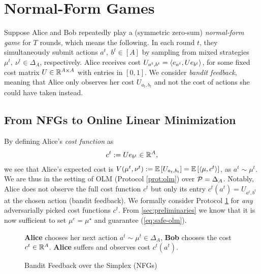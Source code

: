 \documentclass[11pt]{article}
\begin{document}
\section{Normal-Form Games} \label{sec:simplex}

Suppose Alice and Bob repeatedly play a (symmetric zero-sum) \emph{normal-form game} for $T$ rounds, which means the following. In each round $t$, they simultaneously submit actions $a^t,~b^t\in[A]$ by sampling from mixed strategies $\mu^t,~\nu^t\in\Delta_A$, respectively. Alice receives cost $U_{a^t,b^t}=\left\langle e_{a^t}, U e_{b^t} \right\rangle$, for some fixed cost matrix $U\in\mathbb{R}^{A\times A}$ with entries in $[0,1]$. We consider \emph{bandit feedback}, meaning that Alice only observes her cost $U_{a_t,b_t}$ and not the cost of actions she could have taken instead. 

\subsection{From NFGs to Online Linear Minimization} \label{sec:reduction}
By defining Alice's \emph{cost function} as
\begin{align*}
    c^t := U e_{b^t}\in\mathbb{R}^A,    
\end{align*}
we see that Alice's expected cost is $V(\mu^t,\nu^t):=\mathbb{E}\left[ U_{a_t,b_t} \right]=\mathbb{E}\left[ \left\langle \mu, c^t \right\rangle \right]$, as $a^t\sim \mu^t$. We are thus in the setting of OLM (Protocol \ref{prot:olm}) over $\mathcal{P}=\Delta_A$. Notably, Alice does not observe the full cost function $c^t$ but only its entry $c^t(a^t)=U_{a^t,b^t}$ at the chosen action (bandit feedback). We formally consider Protocol \ref{prot:bandit-simplex} for \emph{any} adversarially picked cost functions $c^t$. From \cref{sec:preliminaries} we know that it is now sufficient to set $\mu^c=\mu^\star$ and guarantee (\ref{eq:safe-olm}).
\begin{figure}[H]
\centering
\begin{minipage}{1.0\textwidth}
\begin{protocol}[H]
    \caption{Bandit Feedback over the Simplex (NFGs)} 
    \label{prot:bandit-simplex}
    \centering
    \begin{algorithmic}
            \State \textbf{Alice} chooses her next action $a^t \sim \mu^t \in \Delta_A$, \textbf{Bob} chooses the cost $c^t \in \mathbb{R}^A$.  
            \State \textbf{Alice} suffers and observes cost $c^t(a^t)$. 	
        \EndFor
    \end{algorithmic}
\end{protocol}
\end{minipage}
\end{figure}
\end{document}
